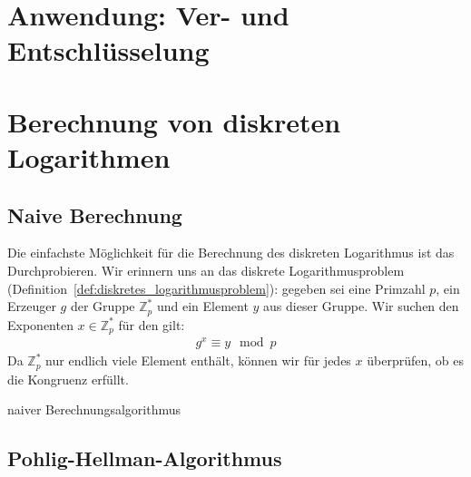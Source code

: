 \documentclass[
  a4paper,
  11pt,
]{scrartcl}
\theoremstyle{plain}
\theoremstyle{definition}
\theoremstyle{remark}
\newcommand{\Z}{\mathbb{Z}}
\renewcommand{\P}{\mathbb{P}}
\begin{document}
\section{Anwendung: Ver- und Entschlüsselung}
\label{sec:anwendung_ver_und_entschlusselung}

\section{Berechnung von diskreten Logarithmen}
\label{sec:berechnung_von_diskreten_logarithmen}

\subsection{Naive Berechnung}
\label{sub:naive_berechnung}

Die einfachste Möglichkeit für die Berechnung des diskreten Logarithmus ist das
Durchprobieren. Wir erinnern uns an das diskrete Logarithmusproblem
(Definition~\ref{def:diskretes_logarithmusproblem}): gegeben sei eine Primzahl
$p$, ein Erzeuger $g$ der Gruppe $\Z_p^*$ und ein Element $y$ aus dieser Gruppe.
Wir suchen den Exponenten $x \in \Z_p^*$ für den gilt:
\begin{align*}
  g^x \equiv y \mod p
\end{align*}
Da $\Z_p^*$ nur endlich viele Element enthält, können wir für jedes $x$
überprüfen, ob es die Kongruenz erfüllt.

\begin{algorithm}\label{alg:1}
  \caption{naiver Berechnungsalgorithmus}
  \begin{algorithmic}
    \REQUIRE{$p \in \P, \left\langle g \right\rangle \in \Z_p^*, y \in \Z_p^*$}
      \ELSE{}
      \ENDIF{}
    \ENDFOR{}
  \end{algorithmic}
\end{algorithm}


\subsection{Pohlig-Hellman-Algorithmus}
\label{sub:pohlig_hellman_algorithmus}
\end{document}

